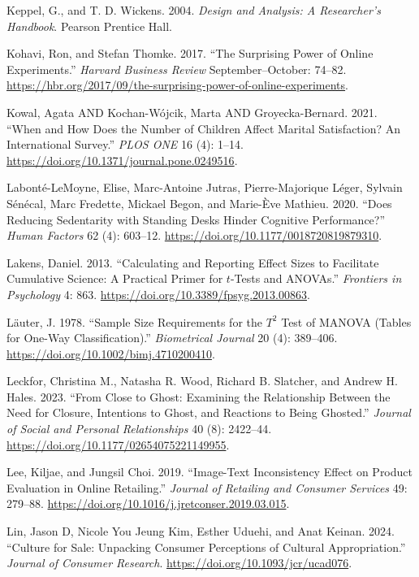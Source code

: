 \documentclass[
  11pt,
  letterpaper,
]{scrbook}
\newlength{\cslhangindent}
\newenvironment{CSLReferences}[2] %
 {\begin{list}{}{%
  \setlength{\itemindent}{0pt}
  \setlength{\leftmargin}{0pt}
  \setlength{\parsep}{0pt}
  \ifodd #1
   \setlength{\leftmargin}{\cslhangindent}
   \setlength{\itemindent}{-1\cslhangindent}
  \fi
  \setlength{\itemsep}{#2\baselineskip}}}
 {\end{list}}
\theoremstyle{definition}
\theoremstyle{definition}
\theoremstyle{remark}
\begin{document}
\begin{CSLReferences}{1}{0}
Keppel, G., and T. D. Wickens. 2004. \emph{Design and Analysis: A
Researcher's Handbook}. Pearson Prentice Hall.

Kohavi, Ron, and Stefan Thomke. 2017. {``The Surprising Power of Online
Experiments.''} \emph{Harvard Business Review} September--October:
74--82.
\url{https://hbr.org/2017/09/the-surprising-power-of-online-experiments}.

Kowal, Agata AND Kochan-Wójcik, Marta AND Groyecka-Bernard. 2021.
{``When and How Does the Number of Children Affect Marital Satisfaction?
An International Survey.''} \emph{PLOS ONE} 16 (4): 1--14.
\url{https://doi.org/10.1371/journal.pone.0249516}.

Labonté-LeMoyne, Elise, Marc-Antoine Jutras, Pierre-Majorique Léger,
Sylvain Sénécal, Marc Fredette, Mickael Begon, and Marie-Ève Mathieu.
2020. {``Does Reducing Sedentarity with Standing Desks Hinder Cognitive
Performance?''} \emph{Human Factors} 62 (4): 603--12.
\url{https://doi.org/10.1177/0018720819879310}.

Lakens, Daniel. 2013. {``Calculating and Reporting Effect Sizes to
Facilitate Cumulative Science: A Practical Primer for \(t\)-Tests and
ANOVAs.''} \emph{Frontiers in Psychology} 4: 863.
\url{https://doi.org/10.3389/fpsyg.2013.00863}.

Läuter, J. 1978. {``Sample Size Requirements for the \(T^2\) Test of
{MANOVA} (Tables for One-Way Classification).''} \emph{Biometrical
Journal} 20 (4): 389--406.
\url{https://doi.org/10.1002/bimj.4710200410}.

Leckfor, Christina M., Natasha R. Wood, Richard B. Slatcher, and Andrew
H. Hales. 2023. {``From Close to Ghost: Examining the Relationship
Between the Need for Closure, Intentions to Ghost, and Reactions to
Being Ghosted.''} \emph{Journal of Social and Personal Relationships} 40
(8): 2422--44. \url{https://doi.org/10.1177/02654075221149955}.

Lee, Kiljae, and Jungsil Choi. 2019. {``Image-Text Inconsistency Effect
on Product Evaluation in Online Retailing.''} \emph{Journal of Retailing
and Consumer Services} 49: 279--88.
\url{https://doi.org/10.1016/j.jretconser.2019.03.015}.

Lin, Jason D, Nicole You Jeung Kim, Esther Uduehi, and Anat Keinan.
2024. {``Culture for Sale: Unpacking Consumer Perceptions of Cultural
Appropriation.''} \emph{Journal of Consumer Research}.
\url{https://doi.org/10.1093/jcr/ucad076}.


\end{CSLReferences}
\end{document}
